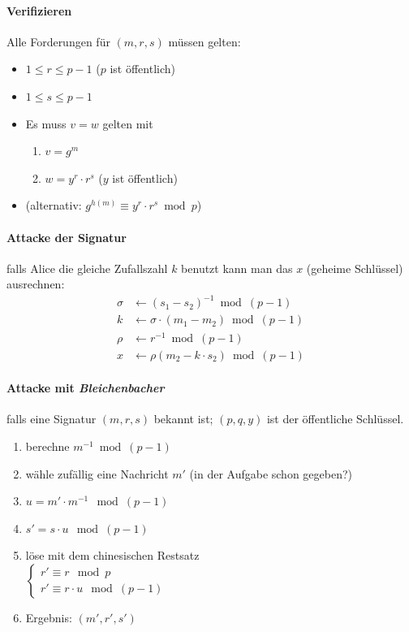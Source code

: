 \documentclass[8pt,a4paper,landscape]{article}
\begin{document}
\begin{multicols}{4}
\paragraph{Verifizieren} Alle Forderungen für $(m, r, s)$ müssen gelten:
\begin{itemize}[itemsep=1pt] 
    \item $1 \leq r \leq p-1$  ($p$ ist öffentlich)
    \item $1 \leq s \leq p-1$ 
    \item Es muss $v=w$ gelten mit \begin{enumerate}[itemsep=1pt] 
    \item $v = g^m$
    \item $w = y^{r} \cdot r^{s}$ ($y$ ist öffentlich)
    \end{enumerate}
    \item (alternativ: $g^{h(m)} \equiv y^{r} \cdot r^{s} \bmod p$)
\end{itemize}

\paragraph{Attacke der Signatur} falls Alice die gleiche Zufallszahl $k$ benutzt 
kann man das $x$ (geheime Schlüssel) ausrechnen:
\begin{align*}
	\sigma &\gets (s_{1} - s_{2})^{-1} \bmod (p-1)\\
    k      &\gets \sigma \cdot (m_{1} - m_{2}) \bmod (p-1)\\
    \rho   &\gets r^{-1} \bmod (p-1)\\
    x      &\gets \rho (m_{2} - k \cdot s_{2}) \bmod (p-1)
\end{align*}

\paragraph{Attacke mit \emph{Bleichenbacher}} falls eine Signatur $(m,r,s)$
bekannt ist; $(p,q,y)$ ist der öffentliche Schlüssel.
\begin{enumerate}
\item berechne $m^{-1} \bmod (p-1)$
\item wähle zufällig eine Nachricht $m'$ (in der Aufgabe schon gegeben?)
\item $u  = m' \cdot m^{-1} \mod (p-1)$
\item $s' = s \cdot u \mod (p-1)$
\item löse mit dem chinesischen Restsatz \\[0.3cm]
      $
		\begin{cases}
            r' \equiv r \mod p \\
            r' \equiv r \cdot u \mod (p-1)
        \end{cases}      
      $
\item Ergebnis: $(m', r', s')$
\end{enumerate}


\end{multicols}
\end{document}
